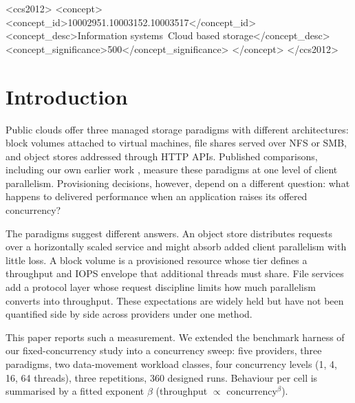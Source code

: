 \documentclass[manuscript,screen,review]{acmart}
\begin{document}
\begin{CCSXML}
<ccs2012>
<concept>
<concept_id>10002951.10003152.10003517</concept_id>
<concept_desc>Information systems~Cloud based storage</concept_desc>
<concept_significance>500</concept_significance>
</concept>
</ccs2012>
\end{CCSXML}


\maketitle

\section{Introduction}
Public clouds offer three managed storage paradigms with different
architectures: block volumes attached to virtual machines, file shares served
over NFS or SMB, and object stores addressed through HTTP APIs. Published
comparisons, including our own earlier work \cite{thesis}, measure these
paradigms at one level of client parallelism. Provisioning decisions, however,
depend on a different question: what happens to delivered performance when an
application raises its offered concurrency?

The paradigms suggest different answers. An object store distributes requests
over a horizontally scaled service and might absorb added client parallelism
with little loss. A block volume is a provisioned resource whose tier defines
a throughput and IOPS envelope that additional threads must share. File
services add a protocol layer whose request discipline limits how much
parallelism converts into throughput. These expectations are widely held but
have not been quantified side by side across providers under one method.

This paper reports such a measurement. We extended the benchmark harness of
our fixed-concurrency study \cite{thesis} into a concurrency sweep: five
providers, three paradigms, two data-movement workload classes, four
concurrency levels (1, 4, 16, 64 threads), three repetitions, 360 designed
runs. Behaviour per cell is summarised by a fitted exponent $\beta$
(throughput $\propto$ concurrency$^{\beta}$).
\end{document}
